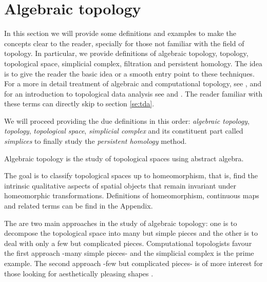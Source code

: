 \documentclass[onecollarge,runningheads]{svjour2}
\begin{document}
\section{Algebraic topology}  %
\label{se:at}

In this section we will provide some definitions and examples to make the concepts clear to the reader, specially for those not familiar with the field of topology. In particular, we provide definitions of algebraic topology, topology, topological space, simplicial complex, filtration and persistent homology. The idea is to give the reader the basic idea or a smooth entry point to these techniques. For a more in detail treatment of algebraic and computational topology, see \cite{munkres1984elements}, \cite{hatcher2001} and for an introduction to topological data analysis see \cite{carlsson2009topology} and \cite{wasserman2016topological}. The reader familiar with these terms can directly skip to section \ref{se:tda}.

We will proceed providing the due definitions in this order: \emph{algebraic topology}, \emph{topology}, \emph{topological space}, \emph{simplicial complex} and its constituent part called \emph{simplices} to finally study the \emph{persistent homology} method.

\begin{definition}
Algebraic topology is the study of topological spaces using abstract algebra.
\end{definition}
The goal is to classify topological spaces up to homeomorphism, that is, find the intrinsic qualitative aspects of spatial objects that remain invariant under homeomorphic transformations. Definitions of homeomorphism, continuous maps and related terms can be find in the Appendix.

The are two main approaches in the study of algebraic topology: one is to decompose the topological space into many but simple pieces and the other is to deal with only a few but complicated pieces. Computational topologists favour the first approach -many simple pieces- and the simplicial complex is the prime example. The second approach -few but complicated pieces- is of more interest for those looking for aesthetically pleasing shapes \cite{edelsbrunner2010computational}. %
\end{document}

